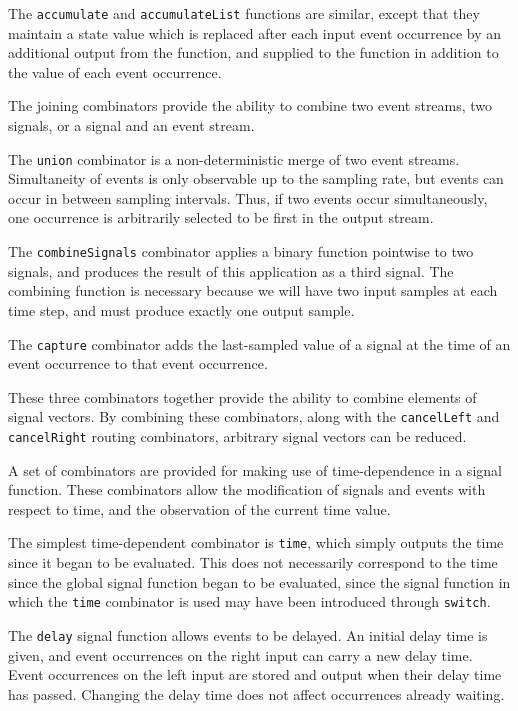 The {\tt accumulate} and {\tt accumulateList} functions are similar, except that
they maintain a state value which is replaced after each input event occurrence
by an additional output from the function, and supplied to the function in
addition to the value of each event occurrence.

The joining combinators provide the ability to combine two event
streams, two signals, or a signal and an event stream.

The {\tt union} combinator is a non-deterministic merge of two event streams.
Simultaneity of events is only observable up to the sampling rate, but events
can occur in between sampling intervals. Thus, if two events occur
simultaneously, one occurrence is arbitrarily selected to be first in the output
stream.

The {\tt combineSignals} combinator applies a binary function pointwise to two
signals, and produces the result of this application as a third signal. The
combining function is necessary because we will have two input samples at each
time step, and must produce exactly one output sample.

The {\tt capture} combinator adds the last-sampled value of a signal at the time
of an event occurrence to that event occurrence.

These three combinators together provide the ability to combine elements of
signal vectors. By combining these combinators, along with the {\tt cancelLeft}
and {\tt cancelRight} routing combinators, arbitrary signal vectors can be
reduced.

A set of combinators are provided for making use of time-dependence in a signal
function. These combinators allow the modification of signals and events with
respect to time, and the observation of the current time value.

The simplest time-dependent combinator is {\tt time}, which simply outputs
the time since it began to be evaluated. This does not necessarily correspond to
the time since the global signal function began to be evaluated, since the
signal function in which the {\tt time} combinator is used may have been
introduced through {\tt switch}.

The {\tt delay} signal function allows events to be delayed. An initial delay
time is given, and event occurrences on the right input can carry a new delay
time. Event occurrences on the left input are stored and output when their delay
time has passed. Changing the delay time does not affect occurrences already
waiting.

